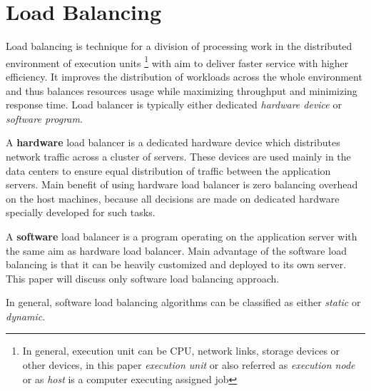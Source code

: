 
\section{Load Balancing}\label{sec:load-balancing}
Load balancing is technique for a division of processing work in the distributed environment of execution units
\footnote{In general, execution unit can be CPU, network links, storage devices or other devices,
in this paper \textit{execution unit} or also referred as \textit{execution node} or as \textit{host} is a computer executing assigned job}
with aim to deliver faster service with higher efficiency.
It improves the distribution of workloads across the whole environment and thus balances resources usage while maximizing throughput and minimizing response time.
Load balancer is typically either dedicated \textit{hardware device} or \textit{software program}.

A \textbf{hardware} load balancer is a dedicated hardware device which distributes network traffic across a cluster of servers\cite{web:hardwareLoadBalancer}.
These devices are used mainly in the data centers to ensure equal distribution of traffic between the application servers.
Main benefit of using hardware load balancer is zero balancing overhead on the host machines,
because all decisions are made on dedicated hardware specially developed for such tasks.

A \textbf{software} load balancer is a program operating on the application server with the same aim as hardware load balancer.
Main advantage of the software load balancing is that it can be heavily customized and deployed to its own server.
This paper will discuss only software load balancing approach.

\medskip
\noindent In general, software load balancing algorithms can be classified as either \textit{static} or \textit{dynamic}.

